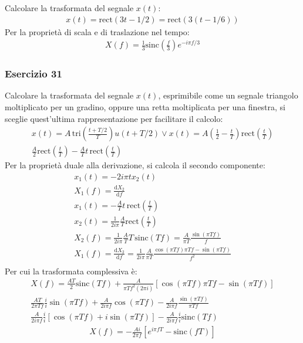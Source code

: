 \documentclass{article}
\newcommand{\rect}{\mathrm{rect}}
\newcommand{\sinc}{\mathrm{sinc}}
\newcommand{\tri}{\mathrm{tri}}
\newcommand{\df}{\mathrm{d}}
\begin{document}
Calcolare la trasformata del segnale $x(t)$: 
\begin{gather*}
    x(t)=\rect(3t-1/2)=\rect(3(t-1/6))
\end{gather*}
Per la proprietà di scala e di traslazione nel tempo:
\begin{gather}
    X(f)=\displaystyle\frac{1}{3}\sinc\left(\frac{f}{3}\right)e^{-i\pi f/3}
\end{gather}

\subsubsection*{Esercizio 31}

Calcolare la trasformata del segnale $x(t)$, esprimibile come un segnale triangolo moltiplicato per un gradino, oppure una retta moltiplicata per una finestra, si sceglie 
quest'ultima rappresentazione per facilitare il calcolo:
\begin{gather*}
    x(t)=A\,\displaystyle\tri \left(\frac{t+T/2}{T}\right)u(t+T/2)\lor x(t)=A\left(\frac{1}{2}-\frac{t}{T}\right)\rect\left(\frac{t}{T}\right)\\
    \displaystyle\frac{A}{2}\rect\left(\frac{t}{T}\right)-\frac{A}{T}t\,\rect\left(\frac{t}{T}\right)
\end{gather*}
Per la proprietà duale alla derivazione, si calcola il secondo componente: 
\begin{gather*}
    x_1(t)=-2i\pi tx_2(t)\\
    X_1(f)=\displaystyle\frac{\df X_2}{\df f}\\
    x_1(t)=-\displaystyle\frac{A}{T}t\,\rect\left(\frac{t}{T}\right)\\
    x_2(t)=\displaystyle\frac{1}{2i\pi}\frac{A}{T}\rect\left(\frac{t}{T}\right)\\
    X_2(f)=\displaystyle\frac{1}{2i\pi}\frac{A}{T}T\,\sinc(Tf)=\frac{A}{\pi T}\frac{\sin(\pi Tf)}{f}\\
    X_1(f)=\displaystyle\frac{\df X_2}{\df f}=\frac{1}{2i\pi}\frac{A}{\pi T}\frac{\cos(\pi Tf)\pi Tf-\sin(\pi Tf)}{f^2}\\
\end{gather*}
Per cui la trasformata complessiva è:
\begin{gather*}
    X(f)=\displaystyle\frac{AT}{2}\sinc(Tf)+\frac{A}{\pi Tf^2(2\pi i)}\left[\cos(\pi Tf)\pi Tf-\sin (\pi Tf)\right]\\
    \displaystyle\frac{AT}{2\pi Tf}\frac{i}{i}\sin(\pi Tf)+\frac{A}{2i\pi f}\cos(\pi Tf)-\frac{A}{2i\pi f}\frac{\sin(\pi Tf)}{\pi Tf}\\
    \displaystyle\frac{A}{2i\pi f}\frac{i}{i}\left[\cos(\pi Tf)+i\sin(\pi Tf)\right]-\frac{A}{2i\pi f}\frac{i}{i}\sinc( Tf)
\end{gather*}
\begin{gather}
    X(f)=\displaystyle-\frac{Ai}{2\pi f}\left[e^{i\pi fT}-\sinc(fT)\right]
\end{gather}
\end{document}
